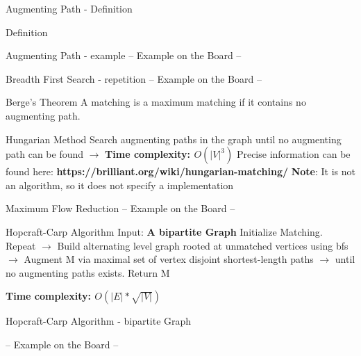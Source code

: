 \begin{frame}{Augmenting Path - Definition}
\begin{block}{Definition}
\end{block} 
\end{frame}

\begin{frame}{Augmenting Path - example}
-- Example on the Board --
  
\end{frame}

\begin{frame}{Breadth First Search - repetition}
-- Example on the Board --
  
\end{frame}

\begin{frame}{Berge's Theorem}
A matching is a maximum matching if it contains no augmenting path.
  
\end{frame}

\begin{frame}{Hungarian Method}
Search augmenting paths in the graph until no augmenting path can be found\newline
\newline
$\rightarrow$ \textbf {Time complexity: $O(|V|^3)$}\newline
\newline
Precise information can be found here: \textbf {https://brilliant.org/wiki/hungarian-matching/}\newline
\newline
\textbf {Note}: It is not an algorithm, so it does not specify a implementation
\end{frame}

\begin{frame}{Maximum Flow Reduction}
-- Example on the Board --
  
\end{frame}

\begin{frame}{Hopcraft-Carp Algorithm}
Input: \textbf{A bipartite Graph}
Initialize Matching. Repeat\newline
$\rightarrow$ Build alternating level graph rooted at unmatched vertices using bfs\newline
$\rightarrow$ Augment M via maximal set of vertex disjoint shortest-length paths\newline
$\rightarrow$ until no augmenting paths exists. Return M\newline
		
\textbf {Time complexity: $O(|E|*\sqrt{|V|})$}
  
\end{frame}

\begin{frame}{Hopcraft-Carp Algorithm - bipartite Graph}

-- Example on the Board --
  
\end{frame}
